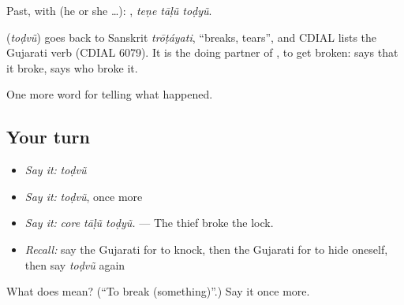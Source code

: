 Past, with  (he or she …):   , \emph{teṇe tāḷũ toḍyũ}.

\begin{cousinweb}
\textbf{} (\emph{toḍvũ}) goes back to Sanskrit \emph{trōṭáyati}, \textquotedblleft{}breaks, tears\textquotedblright{}, and CDIAL lists the Gujarati verb (CDIAL 6079). It is the doing partner of \textbf{}, to get broken: \textbf{ } says that it broke, \textbf{  } says who broke it.
\end{cousinweb}

\begin{grammarlens}[title={What you've built}]
One more word for telling what happened.
\end{grammarlens}

\subsection*{Your turn}
\begin{itemize}
\raggedright
  \item \emph{Say it:} \emph{toḍvũ}
  \item \emph{Say it:} \emph{toḍvũ}, once more
  \item \emph{Say it:} \emph{core tāḷũ toḍyũ.} — The thief broke the lock.
  \item \emph{Recall:} say the Gujarati for to knock, then the Gujarati for to hide oneself, then say \emph{toḍvũ} again
\end{itemize}

\begin{tcolorbox}[breakable,colback=teal!4,colframe=teal!35!black,title={Before you move on}]
What does  mean? (\textquotedblleft{}To break (something)\textquotedblright{}.) Say it once more.
\end{tcolorbox}
